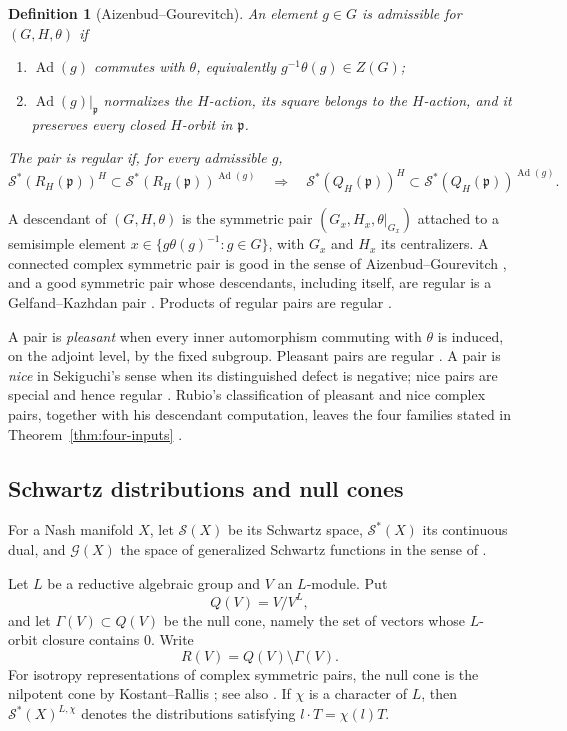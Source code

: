 \documentclass[10pt,a4paper]{amsart}
\numberwithin{equation}{section}
\newtheorem{definition}[theorem]{Definition}
\newcommand{\Ad}{\operatorname{Ad}}
\newcommand{\fp}{\mathfrak p}
\newcommand{\cS}{\mathcal S}
\newcommand{\cG}{\mathcal G}
\begin{document}
\begin{definition}[Aizenbud--Gourevitch]\label{def:regularity}
An element $g\in G$ is \emph{admissible} for $(G,H,\theta)$ if
\begin{enumerate}[label=\textup{(\roman*)}]
\item $\Ad(g)$ commutes with $\theta$, equivalently
      $g^{-1}\theta(g)\in Z(G)$;
\item $\Ad(g)|_{\fp}$ normalizes the $H$-action, its square belongs to the
      $H$-action, and it preserves every closed $H$-orbit in $\fp$.
\end{enumerate}
The pair is \emph{regular} if, for every admissible $g$,
\[
 \cS^*(R_H(\fp))^H\subset\cS^*(R_H(\fp))^{\Ad(g)}
 \quad\Longrightarrow\quad
 \cS^*(Q_H(\fp))^H\subset\cS^*(Q_H(\fp))^{\Ad(g)}.
\]
\end{definition}

A descendant of $(G,H,\theta)$ is the symmetric pair
$(G_x,H_x,\theta|_{G_x})$ attached to a semisimple element
$x\in\{g\theta(g)^{-1}:g\in G\}$, with $G_x$ and $H_x$ its centralizers.
A connected complex symmetric pair is good in the sense of
Aizenbud--Gourevitch \cite[Corollary~7.1.7]{AG09}, and a good symmetric pair
whose descendants, including itself, are regular is a Gelfand--Kazhdan pair
\cite[Theorem~7.4.5]{AG09}.  Products of regular pairs are regular
\cite[Proposition~7.4.4]{AG09}.

A pair is \emph{pleasant} when every inner automorphism commuting with $\theta$
is induced, on the adjoint level, by the fixed subgroup.  Pleasant pairs are
regular \cite[Lemma~4.2]{Rubio}.  A pair is \emph{nice} in Sekiguchi's sense
when its distinguished defect is negative; nice pairs are special and hence
regular \cite{Sekiguchi,Aiz13}.  Rubio's classification of pleasant and nice
complex pairs, together with his descendant computation, leaves the four
families stated in Theorem~\ref{thm:four-inputs} \cite[Proposition~6.3]{Rubio}.

\subsection{Schwartz distributions and null cones}
For a Nash manifold $X$, let $\cS(X)$ be its Schwartz space,
$\cS^*(X)$ its continuous dual, and $\cG(X)$ the space of generalized
Schwartz functions in the sense of \cite[Appendix~B]{AG09}.

Let $L$ be a reductive algebraic group and $V$ an $L$-module.  Put
\[
 Q(V)=V/V^L,
\]
and let $\Gamma(V)\subset Q(V)$ be the null cone, namely the set of vectors
whose $L$-orbit closure contains $0$.  Write
\[
 R(V)=Q(V)\setminus\Gamma(V).
\]
For isotropy representations of complex symmetric pairs, the null cone is the
nilpotent cone by Kostant--Rallis \cite{KR}; see also
\cite[Lemma~7.3.8]{AG09}.  If $\chi$ is a character of $L$, then
$\cS^*(X)^{L,\chi}$ denotes the distributions satisfying
$l\cdot T=\chi(l)T$.
\end{document}
